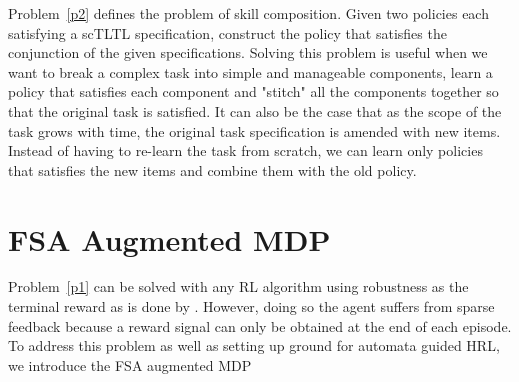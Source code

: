\documentclass{article}
\begin{document}
\noindent Problem~\ref{p2} defines the problem of skill composition. Given two policies each satisfying a scTLTL specification, construct the policy that satisfies the conjunction of the given specifications. Solving this problem is useful when we want to break a complex task into simple and manageable components, learn a policy that satisfies each component and "stitch" all the components together so that the original task is satisfied. It can also be the case that as the scope of the task grows with time, the original task specification is amended with new items. Instead of having to re-learn the task from scratch, we can learn only policies that satisfies the new items and combine them with the old policy. 


\section{FSA Augmented MDP}
\label{augmentedMDP}

Problem~\ref{p1} can be solved with any RL algorithm using robustness as the terminal reward as is done by \cite{li2016reinforcement}. However, doing so the agent suffers from sparse feedback because a reward signal can only be obtained at the end of each episode. To address this problem as well as setting up ground for automata guided HRL, we introduce the FSA augmented MDP
\end{document}
